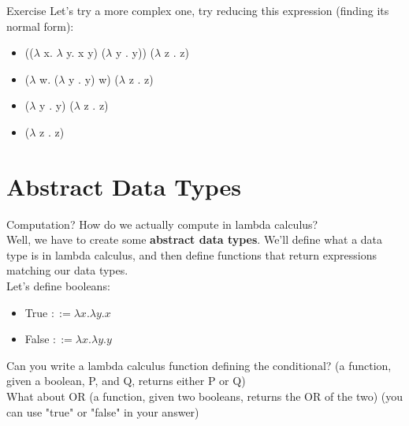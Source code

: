 \documentclass[aspectratio=169]{beamer}
\begin{document}
\begin{frame}{Exercise}
    Let's try a more complex one, try reducing this expression (finding its normal form):
    \begin{itemize}
        \item (($\lambda$ x. $\lambda$ y. x y) ($\lambda$ y . y)) ($\lambda$ z . z) \pause
        \item ($\lambda$ w. ($\lambda$ y . y) w) ($\lambda$ z . z)
        \item ($\lambda$ y . y) ($\lambda$ z . z)
        \item ($\lambda$ z . z)
    \end{itemize}
\end{frame}

\section{Abstract Data Types}
\frame{\sectionpage}

\begin{frame}{Computation?}
    How do we actually compute in lambda calculus? \pause \\
    Well, we have to create some \textbf{abstract data types}. We'll define what a data type is in lambda calculus, and then define functions that return expressions matching our data types. \pause \\

    Let's define booleans:
    \begin{itemize}
    \item True $::= \lambda x. \lambda y. x$ \\
    \item False $::= \lambda x. \lambda y. y$ \\
    \end{itemize}

    Can you write a lambda calculus function defining the conditional? (a function, given a boolean, P, and Q, returns either P or Q) \\

    What about OR (a function, given two booleans, returns the OR of the two) (you can use "true" or "false" in your answer)
\end{frame}
\end{document}
